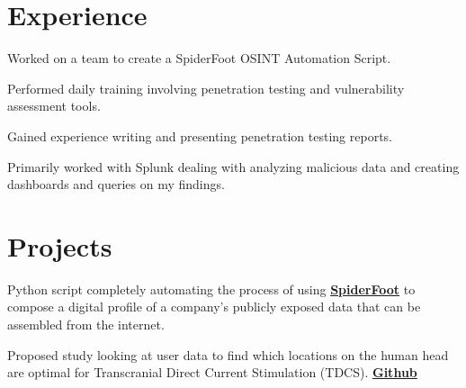\documentclass[]{deedy-resume-openfont}
\begin{document}
\begin{minipage}[t]{0.66\textwidth} 


\section{Experience}
\vspace{\topsep} %
\begin{tightemize}
\item Worked on a team to create a SpiderFoot OSINT Automation Script.
\item Performed daily training involving penetration testing and vulnerability assessment tools. 
\item Gained experience writing and presenting penetration testing reports. 
\end{tightemize}
\sectionsep

\begin{tightemize}
\item Primarily worked with Splunk dealing with analyzing malicious data and creating dashboards and queries on my findings.
\end{tightemize}
\sectionsep


\section{Projects}
Python script completely automating the process of using \textbf{\href{https://www.spiderfoot.net/documentation/}{SpiderFoot}} to compose a digital profile of a company's publicly exposed data that can be assembled from the internet. 

Proposed study looking at user data to find which locations on the human head are optimal for Transcranial Direct Current Stimulation (TDCS). \textbf{\href{https://github.com/amvisca32/Brainjacking-Study}{Github}}


\end{minipage}
\end{document}
